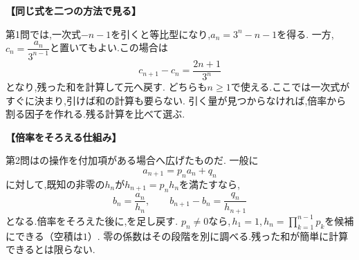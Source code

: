   \noindent\textbf{【同じ式を二つの方法で見る】}\par
  第1問では,一次式$-n-1$を引くと等比型になり,$a_n=3^n-n-1$を得る.
  一方,$c_n=\dfrac{a_n}{3^{n-1}}$と置いてもよい.この場合は
  \[
    c_{n+1}-c_n=\frac{2n+1}{3^n}
  \]
  となり,残った和を計算して元へ戻す.
  どちらも$n\ge1$で使える.ここでは一次式がすぐに決まり,引けば和の計算も要らない.
  引く量が見つからなければ,倍率から割る因子を作れる.残る計算を比べて選ぶ.

  \noindent\textbf{【倍率をそろえる仕組み】}\par
  第2問はの操作を付加項がある場合へ広げたものだ.
  一般に
  \[
    a_{n+1}=p_na_n+q_n
  \]
  に対して,既知の非零の$h_n$が$h_{n+1}=p_nh_n$を満たすなら,
  \[
    b_n=\frac{a_n}{h_n},\qquad
    b_{n+1}-b_n=\frac{q_n}{h_{n+1}}
  \]
  となる.倍率をそろえた後に,を足し戻す.
  $p_n\ne0$なら,\,$h_1=1$,\,$h_n=\prod_{k=1}^{n-1}p_k$を候補にできる（空積は$1$）.
  零の係数はその段階を別に調べる.残った和が簡単に計算できるとは限らない.
